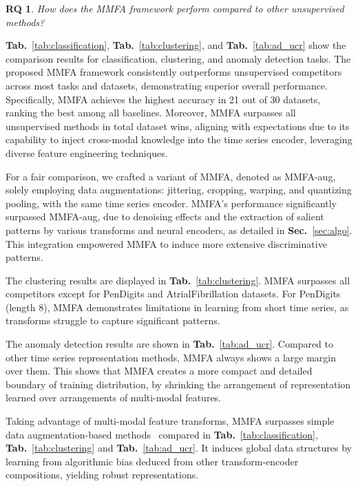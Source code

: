 \documentclass{article}
\newtheorem{researchq}{RQ}
\begin{document}
\begin{researchq}
How does the MMFA framework perform compared to other unsupervised methods?
\end{researchq}

\textbf{Tab.}~\ref{tab:classification}, \textbf{Tab.}~\ref{tab:clustering}, and \textbf{Tab.}~\ref{tab:ad_ucr} show the comparison results for classification, clustering, and anomaly detection tasks. The proposed MMFA framework consistently outperforms unsupervised competitors across most tasks and datasets, demonstrating superior overall performance. Specifically, MMFA achieves the highest accuracy in 21 out of 30 datasets, ranking the best among all baselines. Moreover, MMFA surpasses all unsupervised methods in total dataset wins, aligning with expectations due to its capability to inject cross-modal knowledge into the time series encoder, leveraging diverse feature engineering techniques.

For a fair comparison, we crafted a variant of MMFA, denoted as MMFA-aug, solely employing data augmentations: jittering, cropping, warping, and quantizing pooling, with the same time series encoder. MMFA's performance significantly surpassed MMFA-aug, due to denoising effects and the extraction of salient patterns by various transforms and neural encoders, as detailed in \textbf{Sec.}~\ref{sec:algo}. This integration empowered MMFA to induce more extensive discriminative patterns.

The clustering results are displayed in \textbf{Tab.}~\ref{tab:clustering}. MMFA surpasses all competitors except for PenDigits and AtrialFibrillation datasets. For PenDigits (length 8), MMFA demonstrates limitations in learning from short time series, as transforms struggle to capture significant patterns.

The anomaly detection results are shown in \textbf{Tab.}~\ref{tab:ad_ucr}. Compared to other time series representation methods, MMFA always shows a large margin over them. This shows that MMFA creates a more compact and detailed boundary of training distribution, by shrinking the arrangement of representation learned over arrangements of multi-modal features.


Taking advantage of multi-modal feature transforms, MMFA surpasses simple data augmentation-based methods~\cite{yue2022ts2vec,liang2023contrastive,eldele2021time,zerveas2021transformer} compared in \textbf{Tab.}~\ref{tab:classification}, \textbf{Tab.}~\ref{tab:clustering} and \textbf{Tab.}~\ref{tab:ad_ucr}. It induces global data structures by learning from algorithmic bias deduced from other transform-encoder compositions, yielding robust representations.
\end{document}
